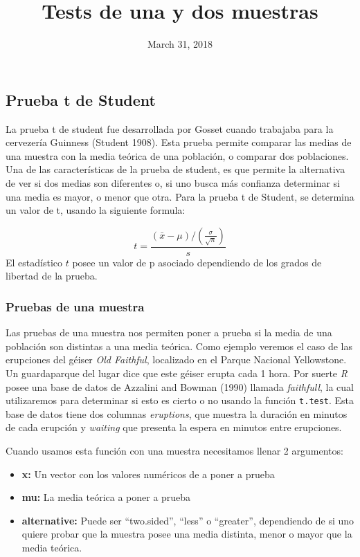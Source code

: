 \documentclass[]{article}
\title{Tests de una y dos muestras}
\author{}
\date{March 31, 2018}
\providecommand{\tightlist}{%
  \setlength{\itemsep}{0pt}\setlength{\parskip}{0pt}}
\begin{document}
\maketitle

{
\setcounter{tocdepth}{2}
\tableofcontents
}
\subsection{Prueba t de Student}\label{prueba-t-de-student}

La prueba t de student fue desarrollada por Gosset cuando trabajaba para
la cervezería Guinness (Student 1908). Esta prueba permite comparar las
medias de una muestra con la media teórica de una población, o comparar
dos poblaciones. Una de las características de la prueba de student, es
que permite la alternativa de ver si dos medias son diferentes o, si uno
busca más confianza determinar si una media es mayor, o menor que otra.
Para la prueba t de Student, se determina un valor de t, usando la
siguiente formula:

\[t = \frac{(\bar{x} - \mu)/(\frac{\sigma}{\sqrt{n}})}{s}\] El
estadístico \(t\) posee un valor de p asociado dependiendo de los grados
de libertad de la prueba.

\subsubsection{Pruebas de una muestra}\label{pruebas-de-una-muestra}

Las pruebas de una muestra nos permiten poner a prueba si la media de
una población son distintas a una media teórica. Como ejemplo veremos el
caso de las erupciones del géiser \emph{Old Faithful}, localizado en el
Parque Nacional Yellowstone. Un guardaparque del lugar dice que este
géiser erupta cada 1 hora. Por suerte \emph{R} posee una base de datos
de Azzalini and Bowman (1990) llamada \emph{faithfull}, la cual
utilizaremos para determinar si esto es cierto o no usando la función
\texttt{t.test}. Esta base de datos tiene dos columnas \emph{eruptions},
que muestra la duración en minutos de cada erupción y \emph{waiting} que
presenta la espera en minutos entre erupciones.

Cuando usamos esta función con una muestra necesitamos llenar 2
argumentos:

\begin{itemize}
\tightlist
\item
  \textbf{x:} Un vector con los valores numéricos de a poner a prueba
\item
  \textbf{mu:} La media teórica a poner a prueba
\item
  \textbf{alternative:} Puede ser ``two.sided'', ``less'' o ``greater'',
  dependiendo de si uno quiere probar que la muestra posee una media
  distinta, menor o mayor que la media teórica.
\end{itemize}
\end{document}
